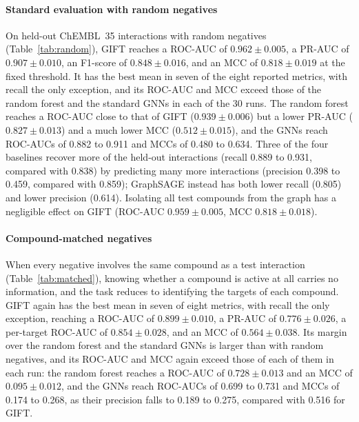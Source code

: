 \documentclass[11pt,letterpaper]{article}
\begin{document}
\paragraph{Standard evaluation with random negatives}
On held-out ChEMBL~35 interactions with random negatives (Table~\ref{tab:random}), GIFT reaches a ROC-AUC of $0.962\pm0.005$, a PR-AUC of $0.907\pm0.010$, an F1-score of $0.848\pm0.016$, and an MCC of $0.818\pm0.019$ at the fixed threshold. It has the best mean in seven of the eight reported metrics, with recall the only exception, and its ROC-AUC and MCC exceed those of the random forest and the standard GNNs in each of the 30 runs. The random forest reaches a ROC-AUC close to that of GIFT ($0.939\pm0.006$) but a lower PR-AUC ($0.827\pm0.013$) and a much lower MCC ($0.512\pm0.015$), and the GNNs reach ROC-AUCs of 0.882 to 0.911 and MCCs of 0.480 to 0.634. Three of the four baselines recover more of the held-out interactions (recall 0.889 to 0.931, compared with 0.838) by predicting many more interactions (precision 0.398 to 0.459, compared with 0.859); GraphSAGE instead has both lower recall (0.805) and lower precision (0.614). Isolating all test compounds from the graph has a negligible effect on GIFT (ROC-AUC $0.959\pm0.005$, MCC $0.818\pm0.018$).

\paragraph{Compound-matched negatives}
When every negative involves the same compound as a test interaction (Table~\ref{tab:matched}), knowing whether a compound is active at all carries no information, and the task reduces to identifying the targets of each compound. GIFT again has the best mean in seven of eight metrics, with recall the only exception, reaching a ROC-AUC of $0.899\pm0.010$, a PR-AUC of $0.776\pm0.026$, a per-target ROC-AUC of $0.854\pm0.028$, and an MCC of $0.564\pm0.038$. Its margin over the random forest and the standard GNNs is larger than with random negatives, and its ROC-AUC and MCC again exceed those of each of them in each run: the random forest reaches a ROC-AUC of $0.728\pm0.013$ and an MCC of $0.095\pm0.012$, and the GNNs reach ROC-AUCs of 0.699 to 0.731 and MCCs of 0.174 to 0.268, as their precision falls to 0.189 to 0.275, compared with 0.516 for GIFT.
\end{document}
